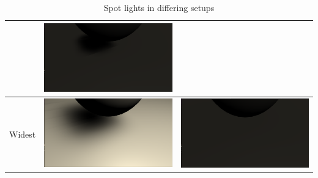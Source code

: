 \begin{table}
\begin{tabular}{| c | c | c | }
\begin{minipage}{.5\textwidth}
            \end{minipage}
            &
            \begin{minipage}{.5\textwidth}
            \includegraphics[width=\linewidth]{figures/shadows/spot-wide-far-cleaned}
            \end{minipage}
    \\ \hline
    Widest &  
            \begin{minipage}{.5\textwidth}
            \includegraphics[width=\linewidth]{figures/shadows/spot-widest-cleaned}
            \end{minipage}
            &
            \begin{minipage}{.5\textwidth}
            \includegraphics[width=\linewidth]{figures/shadows/spot-widest-far-cleaned}
            \end{minipage}
    \\ \hline
  \end{tabular}
  \caption{Spot lights in differing setups}\label{tbl:spot-analysis}
\end{table}

